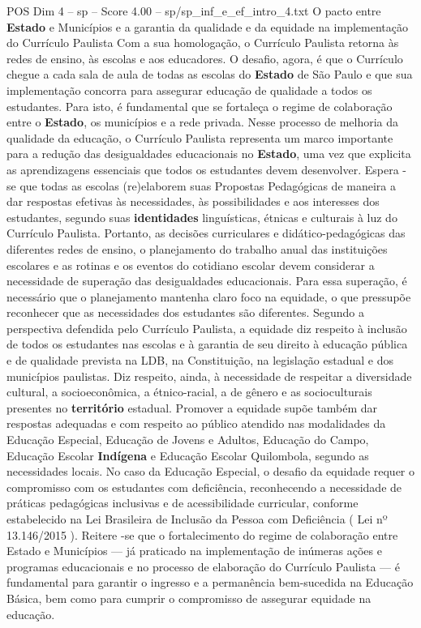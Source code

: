 \begin{textsample}{POS Dim 4 – sp – Score 4.00 – sp/sp\_inf\_e\_ef\_intro\_4.txt}  \label{ex:f4_pos_260}
O pacto entre \textbf{Estado} e Municípios e a garantia da qualidade e da equidade na implementação do Currículo Paulista Com a sua homologação, o Currículo Paulista retorna às redes de ensino, às escolas e aos educadores.
O desafio, agora, é que o Currículo chegue a cada sala de aula de todas as escolas do \textbf{Estado} de São Paulo e que sua implementação concorra para assegurar educação de qualidade a todos os estudantes.
Para isto, é fundamental que se fortaleça o regime de colaboração entre o \textbf{Estado}, os municípios e a rede privada.
Nesse processo de melhoria da qualidade da educação, o Currículo Paulista representa um marco importante para a redução das desigualdades educacionais no \textbf{Estado}, uma vez que explicita as aprendizagens essenciais que todos os estudantes devem desenvolver.
Espera -se que todas as escolas (re)elaborem suas Propostas Pedagógicas de maneira a dar respostas efetivas às necessidades, às possibilidades e aos interesses dos estudantes, segundo suas \textbf{identidades} linguísticas, étnicas e culturais à luz do Currículo Paulista.
Portanto, as decisões curriculares e didático-pedagógicas das diferentes redes de ensino, o planejamento do trabalho anual das instituições escolares e as rotinas e os eventos do cotidiano escolar devem considerar a necessidade de superação das desigualdades educacionais.
Para essa superação, é necessário que o planejamento mantenha claro foco na equidade, o que pressupõe reconhecer que as necessidades dos estudantes são diferentes.
Segundo a perspectiva defendida pelo Currículo Paulista, a equidade diz respeito à inclusão de todos os estudantes nas escolas e à garantia de seu direito à educação pública e de qualidade prevista na LDB, na Constituição, na legislação estadual e dos municípios paulistas.
Diz respeito, ainda, à necessidade de respeitar a diversidade cultural, a socioeconômica, a étnico-racial, a de gênero e as socioculturais presentes no \textbf{território} estadual.
Promover a equidade supõe também dar respostas adequadas e com respeito ao público atendido nas modalidades da Educação Especial, Educação de Jovens e Adultos, Educação do Campo, Educação Escolar \textbf{Indígena} e Educação Escolar Quilombola, segundo as necessidades locais.
No caso da Educação Especial, o desafio da equidade requer o compromisso com os estudantes com deficiência, reconhecendo a necessidade de práticas pedagógicas inclusivas e de acessibilidade curricular, conforme estabelecido na Lei Brasileira de Inclusão da Pessoa com Deficiência ( Lei nº 13.146/2015 ).
Reitere -se que o fortalecimento do regime de colaboração entre Estado e Municípios — já praticado na implementação de inúmeras ações e programas educacionais e no processo de elaboração do Currículo Paulista — é fundamental para garantir o ingresso e a permanência bem-sucedida na Educação Básica, bem como para cumprir o compromisso de assegurar equidade na educação.

\end{textsample}
